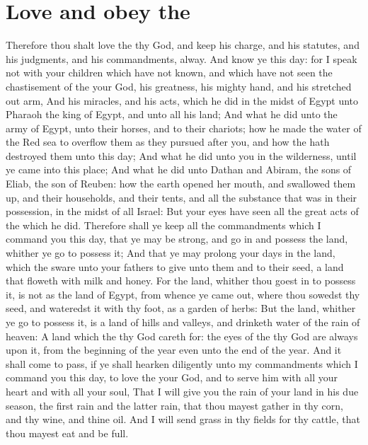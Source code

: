 \section*{Love and obey the \LORD}
\begin{biblechapter} %
\verse Therefore thou shalt love the \LORD thy God, and keep his charge, and his statutes, and his judgments, and his commandments, alway.
\verse And know ye this day: for I speak not with your children which have not known, and which have not seen the chastisement of the \LORD your God, his greatness, his mighty hand, and his stretched out arm,
\verse And his miracles, and his acts, which he did in the midst of Egypt unto Pharaoh the king of Egypt, and unto all his land;
\verse And what he did unto the army of Egypt, unto their horses, and to their chariots; how he made the water of the Red sea to overflow them as they pursued after you, and how the \LORD hath destroyed them unto this day;
\verse And what he did unto you in the wilderness, until ye came into this place;
\verse And what he did unto Dathan and Abiram, the sons of Eliab, the son of Reuben: how the earth opened her mouth, and swallowed them up, and their households, and their tents, and all the substance that was in their possession, in the midst of all Israel:
\verse But your eyes have seen all the great acts of the \LORD which he did.
\verse Therefore shall ye keep all the commandments which I command you this day, that ye may be strong, and go in and possess the land, whither ye go to possess it;
\verse And that ye may prolong your days in the land, which the \LORD sware unto your fathers to give unto them and to their seed, a land that floweth with milk and honey.
\verse For the land, whither thou goest in to possess it, is not as the land of Egypt, from whence ye came out, where thou sowedst thy seed, and wateredst it with thy foot, as a garden of herbs:
\verse But the land, whither ye go to possess it, is a land of hills and valleys, and drinketh water of the rain of heaven:
\verse A land which the \LORD thy God careth for: the eyes of the \LORD thy God are always upon it, from the beginning of the year even unto the end of the year.
\verse And it shall come to pass, if ye shall hearken diligently unto my commandments which I command you this day, to love the \LORD your God, and to serve him with all your heart and with all your soul,
\verse That I will give you the rain of your land in his due season, the first rain and the latter rain, that thou mayest gather in thy corn, and thy wine, and thine oil.
\verse And I will send grass in thy fields for thy cattle, that thou mayest eat and be full.

\end{biblechapter}
